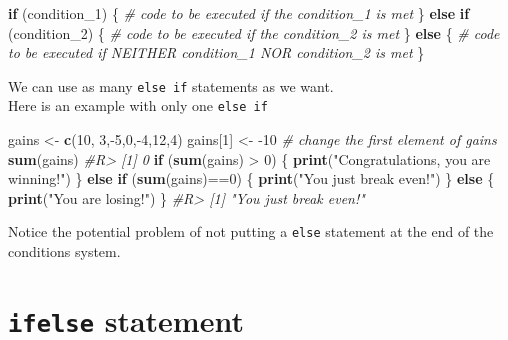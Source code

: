 \documentclass[]{book}
\newenvironment{Shaded}{}{}
\newcommand{\CommentTok}[1]{\textcolor[rgb]{0.38,0.63,0.69}{\textit{#1}}}
\newcommand{\ControlFlowTok}[1]{\textcolor[rgb]{0.00,0.44,0.13}{\textbf{#1}}}
\newcommand{\DecValTok}[1]{\textcolor[rgb]{0.25,0.63,0.44}{#1}}
\newcommand{\KeywordTok}[1]{\textcolor[rgb]{0.00,0.44,0.13}{\textbf{#1}}}
\newcommand{\NormalTok}[1]{#1}
\newcommand{\OperatorTok}[1]{\textcolor[rgb]{0.40,0.40,0.40}{#1}}
\newcommand{\StringTok}[1]{\textcolor[rgb]{0.25,0.44,0.63}{#1}}
\theoremstyle{definition}
\theoremstyle{definition}
\theoremstyle{definition}
\theoremstyle{remark}
\begin{document}
\begin{Shaded}
\begin{Highlighting}[]
\ControlFlowTok{if}\NormalTok{ (condition_}\DecValTok{1}\NormalTok{) \{ }
\CommentTok{# code to be executed if the condition_1 is met}
\NormalTok{\} }\ControlFlowTok{else} \ControlFlowTok{if}\NormalTok{ (condition_}\DecValTok{2}\NormalTok{) \{}
\CommentTok{# code to be executed if the condition_2 is met}
\NormalTok{\} }\ControlFlowTok{else}\NormalTok{ \{}
\CommentTok{# code to be executed if NEITHER condition_1 NOR condition_2 is met}
\NormalTok{\}}
\end{Highlighting}
\end{Shaded}

We can use as many \texttt{else\ if} statements as we want.\\
Here is an example with only one \texttt{else\ if}

\begin{Shaded}
\begin{Highlighting}[]
\NormalTok{gains <-}\StringTok{ }\KeywordTok{c}\NormalTok{(}\DecValTok{10}\NormalTok{, }\DecValTok{3}\NormalTok{,}\OperatorTok{-}\DecValTok{5}\NormalTok{,}\DecValTok{0}\NormalTok{,}\OperatorTok{-}\DecValTok{4}\NormalTok{,}\DecValTok{12}\NormalTok{,}\DecValTok{4}\NormalTok{)}
\NormalTok{gains[}\DecValTok{1}\NormalTok{] <-}\StringTok{ }\DecValTok{-10} \CommentTok{# change the first element of gains}
\KeywordTok{sum}\NormalTok{(gains)}
\CommentTok{#R> [1] 0}
\ControlFlowTok{if}\NormalTok{ (}\KeywordTok{sum}\NormalTok{(gains) }\OperatorTok{>}\StringTok{ }\DecValTok{0}\NormalTok{) \{}
  \KeywordTok{print}\NormalTok{(}\StringTok{"Congratulations, you are winning!"}\NormalTok{)}
\NormalTok{\} }\ControlFlowTok{else} \ControlFlowTok{if}\NormalTok{ (}\KeywordTok{sum}\NormalTok{(gains)}\OperatorTok{==}\DecValTok{0}\NormalTok{) \{}
  \KeywordTok{print}\NormalTok{(}\StringTok{"You just break even!"}\NormalTok{)}
\NormalTok{\} }\ControlFlowTok{else}\NormalTok{ \{}
  \KeywordTok{print}\NormalTok{(}\StringTok{"You are losing!"}\NormalTok{)}
\NormalTok{\}}
\CommentTok{#R> [1] "You just break even!"}
\end{Highlighting}
\end{Shaded}

Notice the potential problem of not putting a \texttt{else} statement at
the end of the conditions system.

\hypertarget{ifelse-statement}{%
\section{\texorpdfstring{\texttt{ifelse}
statement}{ifelse statement}}\label{ifelse-statement}}
\end{document}
